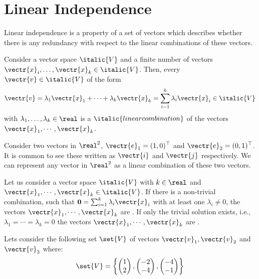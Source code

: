 
\section{Linear Independence}
Linear independence is a property of a set of vectors which describes whether there is any redundancy with respect to the linear combinations of these vectors. 
\begin{definition}
	\normalfont	Consider a vector space $\italic{V}$ and a finite number of vectors $\vectr{x}_i,\ldots,\vectr{x}_k \in \italic{V}$. Then, every $\vectr{v} \in \italic{V}$ of the form
	\begin{align}
		\vectr{v} = \lambda_1\vectr{x}_1 + \cdots + \lambda_k\vectr{x}_k =  \sum_{i=1}^{k} \lambda_i\vectr{x}_i \in \italic{V}
	\end{align}
	with $\lambda_1,\ldots,\lambda_k \in \real$ is a $\italic{linear combination}$ of the vectors $\vectr{x}_1,\cdots,\vectr{x}_k$.
\end{definition}
Consider two vectors in $ \real^2 $, $\vectr{e}_1 = (1, 0)^{\top}$ and $\vectr{e}_2 = (0, 1)^{\top}$. It is common to see these written as $ \vectr{i} $ and $ \vectr{j} $ respectively. We can represent any vector in $ \real^2 $ as a linear combination of these two vectors. 
\begin{definition} 
	\normalfont Let us consider a vector space $\italic{V}$ with $k \in \real$ and  $\vectr{x}_1,\cdots,\vectr{x}_k \in \italic{V}$. If there is a non-trivial combination, such that $\textbf{0} = \sum_{i=1}^{k} \lambda_i\vectr{x}_i$ with at least one $\lambda_i \ne 0$, the vectors  $\vectr{x}_1,\cdots,\vectr{x}_k$ are . If only the trivial solution exists, i.e., $ \lambda_1 = \cdots = \lambda_k = 0 $ the vectors $\vectr{x}_1,\cdots,\vectr{x}_k $ are .
\end{definition}
Lets consider the following set $\set{V}$ of vectors $\vectr{v}_1,\vectr{v}_2 $ and $ \vectr{v}_3$ where:
\begin{align}
	\set{V} = \left\{\begin{pmatrix} 1 \\ 2 \end{pmatrix},\begin{pmatrix} -2 \\ -4 \end{pmatrix},\begin{pmatrix} -4 \\ -1 \end{pmatrix} \right\}
\end{align}
